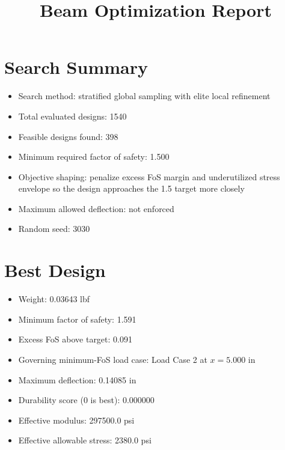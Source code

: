 \documentclass[11pt]{article}
\title{Beam Optimization Report}
\date{}
\begin{document}
\maketitle

\section*{Search Summary}
\begin{itemize}
\item Search method: stratified global sampling with elite local refinement
\item Total evaluated designs: 1540
\item Feasible designs found: 398
\item Minimum required factor of safety: 1.500
\item Objective shaping: penalize excess FoS margin and underutilized stress envelope so the design approaches the 1.5 target more closely
\item Maximum allowed deflection: not enforced
\item Random seed: 3030
\end{itemize}

\section*{Best Design}
\begin{itemize}
\item Weight: 0.03643 lbf
\item Minimum factor of safety: 1.591
\item Excess FoS above target: 0.091
\item Governing minimum-FoS load case: Load Case 2 at $x=5.000$ in
\item Maximum deflection: 0.14085 in
\item Durability score (0 is best): 0.000000
\item Effective modulus: 297500.0 psi
\item Effective allowable stress: 2380.0 psi
\end{itemize}
\end{document}
